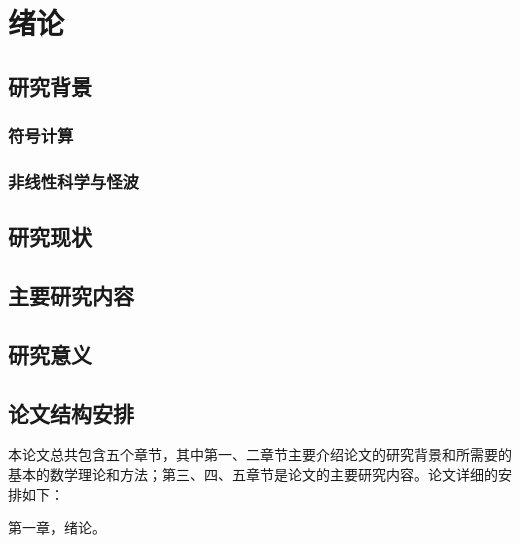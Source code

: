 \chapter{绪论}
\section{研究背景}
\subsection{符号计算}


\subsection{非线性科学与怪波}


\section{研究现状}

\section{主要研究内容}


\section{研究意义}


\section{论文结构安排}
本论文总共包含五个章节，其中第一、二章节主要介绍论文的研究背景和所需要的基本的数学理论和方法；第三、四、五章节是论文的主要研究内容。论文详细的安排如下：

第一章，绪论。











